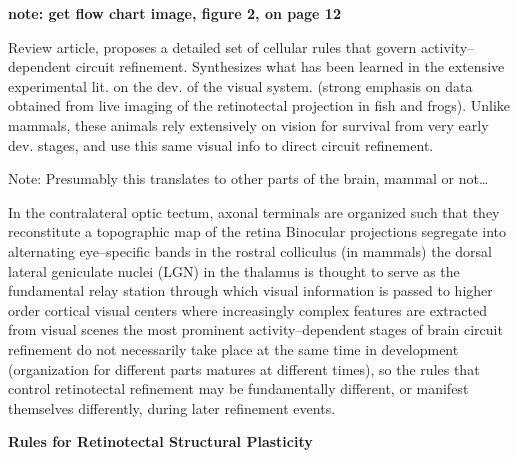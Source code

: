 \documentclass[11pt, a4paper, oneside]{article}   	%
\begin{document}
\textbf{note: get flow chart image, figure 2, on page 12}

Review article, proposes a detailed set of cellular rules that govern activity--dependent circuit refinement. Synthesizes what has been learned in the extensive experimental lit. on the dev. of the visual system. (strong emphasis on data obtained from live imaging of the retinotectal projection in fish and frogs). Unlike mammals, these animals rely extensively on vision for survival from very early dev. stages, and use this same visual info to direct circuit refinement.

Note: Presumably this translates to other parts of the brain, mammal or not\ldots

\begin{outline}
  \point In the contralateral optic tectum, axonal terminals are organized such that they reconstitute a topographic map of the retina
    \point Binocular projections segregate into alternating eye--specific bands in the rostral colliculus (in mammals)
    \point the dorsal lateral geniculate nuclei (LGN) in the thalamus is thought to serve as the fundamental relay station through which visual information is passed to higher order cortical visual centers where increasingly complex features are extracted from visual scenes
    \point the most prominent activity--dependent stages of brain circuit refinement do not necessarily take place at the same time in development (organization for different parts matures at different times), so the rules that control retinotectal refinement may be fundamentally different, or manifest themselves differently, during later refinement events.
\end{outline}

\textbf{Rules for Retinotectal Structural Plasticity}
\end{document}
